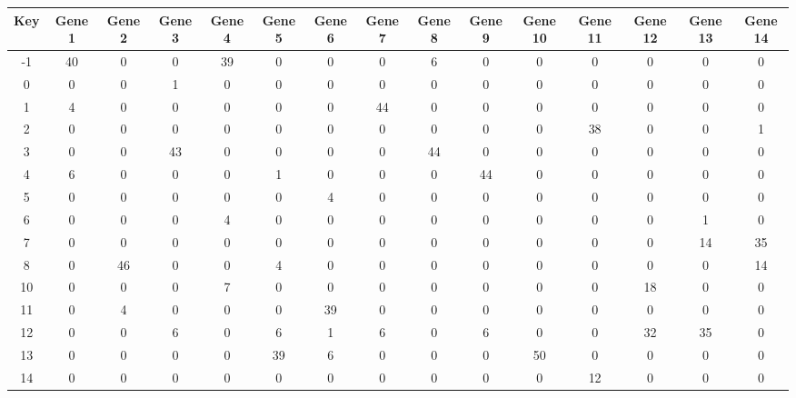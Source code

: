 \begin{tabular}{|c|c|c|c|c|c|c|c|c|c|c|c|c|c|c|}
\hline
Key & Gene 1 & Gene 2 & Gene 3 & Gene 4 & Gene 5 & Gene 6 & Gene 7 & Gene 8 & Gene 9 & Gene 10 & Gene 11 & Gene 12 & Gene 13 & Gene 14 \\
\hline
-1 & 40 & 0 & 0 & 39 & 0 & 0 & 0 & 6 & 0 & 0 & 0 & 0 & 0 & 0 \\
0 & 0 & 0 & 1 & 0 & 0 & 0 & 0 & 0 & 0 & 0 & 0 & 0 & 0 & 0 \\
1 & 4 & 0 & 0 & 0 & 0 & 0 & 44 & 0 & 0 & 0 & 0 & 0 & 0 & 0 \\
2 & 0 & 0 & 0 & 0 & 0 & 0 & 0 & 0 & 0 & 0 & 38 & 0 & 0 & 1 \\
3 & 0 & 0 & 43 & 0 & 0 & 0 & 0 & 44 & 0 & 0 & 0 & 0 & 0 & 0 \\
4 & 6 & 0 & 0 & 0 & 1 & 0 & 0 & 0 & 44 & 0 & 0 & 0 & 0 & 0 \\
5 & 0 & 0 & 0 & 0 & 0 & 4 & 0 & 0 & 0 & 0 & 0 & 0 & 0 & 0 \\
6 & 0 & 0 & 0 & 4 & 0 & 0 & 0 & 0 & 0 & 0 & 0 & 0 & 1 & 0 \\
7 & 0 & 0 & 0 & 0 & 0 & 0 & 0 & 0 & 0 & 0 & 0 & 0 & 14 & 35 \\
8 & 0 & 46 & 0 & 0 & 4 & 0 & 0 & 0 & 0 & 0 & 0 & 0 & 0 & 14 \\
10 & 0 & 0 & 0 & 7 & 0 & 0 & 0 & 0 & 0 & 0 & 0 & 18 & 0 & 0 \\
11 & 0 & 4 & 0 & 0 & 0 & 39 & 0 & 0 & 0 & 0 & 0 & 0 & 0 & 0 \\
12 & 0 & 0 & 6 & 0 & 6 & 1 & 6 & 0 & 6 & 0 & 0 & 32 & 35 & 0 \\
13 & 0 & 0 & 0 & 0 & 39 & 6 & 0 & 0 & 0 & 50 & 0 & 0 & 0 & 0 \\
14 & 0 & 0 & 0 & 0 & 0 & 0 & 0 & 0 & 0 & 0 & 12 & 0 & 0 & 0 \\
\hline
\end{tabular}